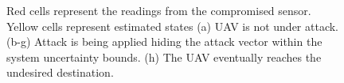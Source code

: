 \documentclass[letterpaper, 10 pt, conference]{ieeeconf}  %
\begin{document}
\begin{figure}[]
	\centering
	\vspace{-5pt}
	\caption{Red cells represent the readings from the compromised sensor. Yellow cells represent estimated states (a) UAV is not under attack. (b-g) Attack is being applied hiding the attack vector within the system uncertainty bounds. (h) The UAV eventually reaches the undesired destination.}
	\label{fig:successful-attack}
\end{figure}
\end{document}
